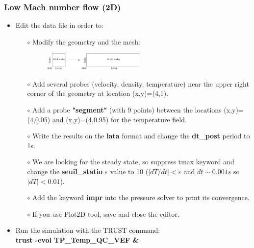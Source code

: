 \documentclass[10pt, hyperref={unicode=true,pdfusetitle, bookmarks=true,bookmarksnumbered=false,bookmarksopen=false, breaklinks=false,pdfborder={0 0 1},backref=true,colorlinks=true,linkcolor=darkblue,pageanchor}]{beamer}
\begin{document}
\begin{frame}
\frametitle{Low Mach number flow (2D)}
\begin{block}{}

\begin{itemize}
\item Edit the data file in order to:
    \begin{itemize}
    \item [$\circ$] Modify the geometry and the mesh:
    \begin{figure}
    \includegraphics[width=0.5\textwidth]{PICTURES/low_mach.pdf}
    \end{figure}
    \item [$\circ$] Add several probes (velocity, density, temperature) near the upper right corner of the geometry at location (x,y)=(4,1).
    \item [$\circ$] Add a probe \textbf{"segment"} (with 9 points) between the locations (x,y)=(4,0.05) and (x,y)=(4,0.95) for the temperature field.
    \item [$\circ$] Write the results on the \textbf{lata} format and change the \textbf{dt\_post} period to 1s.
    \item [$\circ$] We are looking for the steady state, so suppress tmax keyword and change the \textbf{seuil\_statio} $\varepsilon$ value to 10 ($|dT/dt|<\varepsilon$ and $dt \sim 0.001s$ so $|dT|<0.01$).
    \item [$\circ$] Add the keyword \textbf{impr} into the pressure solver to print its convergence.
    \item [$\circ$] If you use Plot2D tool, save and close the editor.
    \end{itemize}

\item Run the simulation with the TRUST command:\\
\textbf{trust -evol TP\_Temp\_QC\_VEF \&} \\
\end{itemize}

\end{block}
\end{frame}
\end{document}
